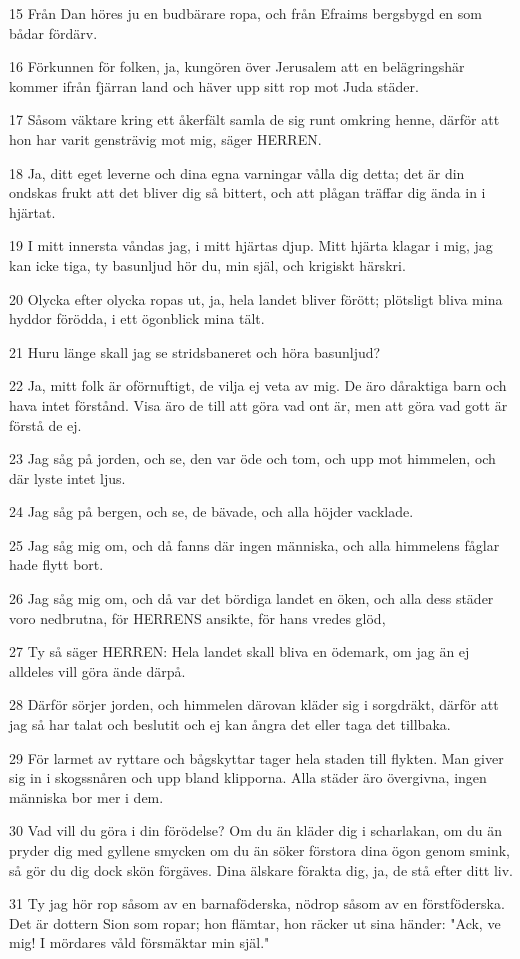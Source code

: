 \par 15 Från Dan höres ju en budbärare ropa, och från Efraims bergsbygd en som bådar fördärv.
\par 16 Förkunnen för folken, ja, kungören över Jerusalem att en belägringshär kommer ifrån fjärran land och häver upp sitt rop mot Juda städer.
\par 17 Såsom väktare kring ett åkerfält samla de sig runt omkring henne, därför att hon har varit gensträvig mot mig, säger HERREN.
\par 18 Ja, ditt eget leverne och dina egna varningar vålla dig detta; det är din ondskas frukt att det bliver dig så bittert, och att plågan träffar dig ända in i hjärtat.
\par 19 I mitt innersta våndas jag, i mitt hjärtas djup. Mitt hjärta klagar i mig, jag kan icke tiga, ty basunljud hör du, min själ, och krigiskt härskri.
\par 20 Olycka efter olycka ropas ut, ja, hela landet bliver förött; plötsligt bliva mina hyddor förödda, i ett ögonblick mina tält.
\par 21 Huru länge skall jag se stridsbaneret och höra basunljud?
\par 22 Ja, mitt folk är oförnuftigt, de vilja ej veta av mig. De äro dåraktiga barn och hava intet förstånd. Visa äro de till att göra vad ont är, men att göra vad gott är förstå de ej.
\par 23 Jag såg på jorden, och se, den var öde och tom, och upp mot himmelen, och där lyste intet ljus.
\par 24 Jag såg på bergen, och se, de bävade, och alla höjder vacklade.
\par 25 Jag såg mig om, och då fanns där ingen människa, och alla himmelens fåglar hade flytt bort.
\par 26 Jag såg mig om, och då var det bördiga landet en öken, och alla dess städer voro nedbrutna, för HERRENS ansikte, för hans vredes glöd,
\par 27 Ty så säger HERREN: Hela landet skall bliva en ödemark, om jag än ej alldeles vill göra ände därpå.
\par 28 Därför sörjer jorden, och himmelen därovan kläder sig i sorgdräkt, därför att jag så har talat och beslutit och ej kan ångra det eller taga det tillbaka.
\par 29 För larmet av ryttare och bågskyttar tager hela staden till flykten. Man giver sig in i skogssnåren och upp bland klipporna. Alla städer äro övergivna, ingen människa bor mer i dem.
\par 30 Vad vill du göra i din förödelse? Om du än kläder dig i scharlakan, om du än pryder dig med gyllene smycken om du än söker förstora dina ögon genom smink, så gör du dig dock skön förgäves. Dina älskare förakta dig, ja, de stå efter ditt liv.
\par 31 Ty jag hör rop såsom av en barnaföderska, nödrop såsom av en förstföderska. Det är dottern Sion som ropar; hon flämtar, hon räcker ut sina händer: "Ack, ve mig! I mördares våld försmäktar min själ."

